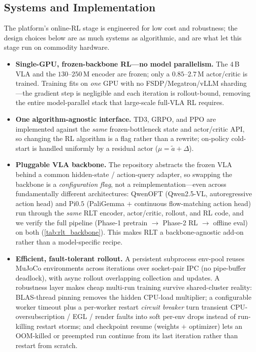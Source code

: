 \documentclass[11pt]{article}
\begin{document}
\subsection{Systems and Implementation}
\label{sec:rlt_impl}
The platform's online-RL stage is engineered for low cost and robustness; the design choices below are as much systems as algorithmic, and are what let this stage run on commodity hardware.
\begin{itemize}[leftmargin=1.3em,itemsep=2pt,topsep=2pt]
  \item \textbf{Single-GPU, frozen-backbone RL---no model parallelism.} The $4$\,B VLA and the $130$--$250$\,M encoder are frozen; only a $0.85$--$2.7$\,M actor/critic is trained. Training fits on \emph{one} GPU with no FSDP/Megatron/vLLM sharding---the gradient step is negligible and each iteration is rollout-bound, removing the entire model-parallel stack that large-scale full-VLA RL requires.
  \item \textbf{One algorithm-agnostic interface.} TD3, GRPO, and PPO are implemented against the \emph{same} frozen-bottleneck state and actor/critic API, so changing the RL algorithm is a flag rather than a rewrite; on-policy cold-start is handled uniformly by a residual actor ($\mu=\tilde a+\Delta$).
  \item \textbf{Pluggable VLA backbone.} The repository abstracts the frozen VLA behind a common hidden-state / action-query adapter, so swapping the backbone is a \emph{configuration flag}, not a reimplementation---even across fundamentally different architectures: QwenOFT (Qwen2.5-VL, autoregressive action head) and Pi$0.5$ (PaliGemma $+$ continuous flow-matching action head) run through the \emph{same} RLT encoder, actor/critic, rollout, and RL code, and we verify the full pipeline (Phase-1 pretrain $\to$ Phase-2 RL $\to$ offline eval) on both (\cref{tab:rlt_backbone}). This makes RLT a backbone-agnostic add-on rather than a model-specific recipe.
  \item \textbf{Efficient, fault-tolerant rollout.} A persistent subprocess env-pool reuses MuJoCo environments across iterations over socket-pair IPC (no pipe-buffer deadlock), with async rollout overlapping collection and updates. A robustness layer makes cheap multi-run training survive shared-cluster reality: BLAS-thread pinning removes the hidden CPU-load multiplier; a configurable worker timeout plus a per-worker restart \emph{circuit breaker} turn transient CPU-oversubscription / EGL / render faults into soft per-env drops instead of run-killing restart storms; and checkpoint resume (weights $+$ optimizer) lets an OOM-killed or preempted run continue from its last iteration rather than restart from scratch.
\end{itemize}
\end{document}
